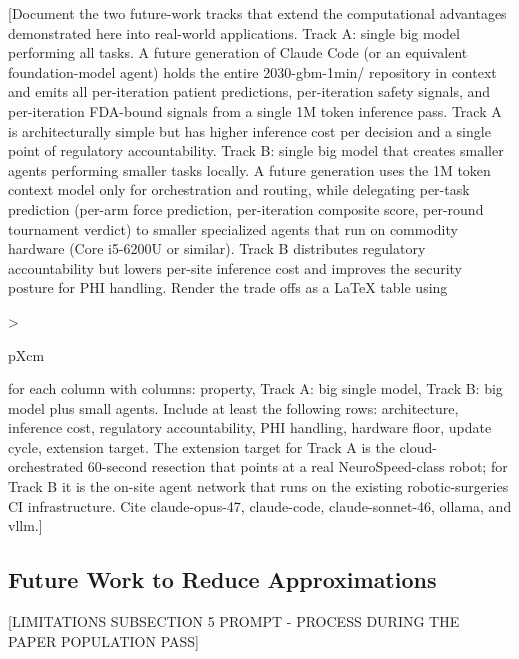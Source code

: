 [Document the two future-work tracks that extend the computational
advantages demonstrated here into real-world applications. Track A:
single big model performing all tasks. A future generation of Claude
Code (or an equivalent foundation-model agent) holds the entire
2030-gbm-1min/ repository in context and emits all per-iteration
patient predictions, per-iteration safety signals, and per-iteration
FDA-bound signals from a single 1M token inference pass. Track A is
architecturally simple but has higher inference cost per decision
and a single point of regulatory accountability. Track B: single big
model that creates smaller agents performing smaller tasks locally.
A future generation uses the 1M token context model only for
orchestration and routing, while delegating per-task prediction
(per-arm force prediction, per-iteration composite score, per-round
tournament verdict) to smaller specialized agents that run on
commodity hardware (Core i5-6200U or similar). Track B distributes
regulatory accountability but lowers per-site inference cost and
improves the security posture for PHI handling. Render the trade
offs as a LaTeX table using {>{\raggedright\arraybackslash}p{Xcm}}
for each column with columns: property, Track A: big single model,
Track B: big model plus small agents. Include at least the following
rows: architecture, inference cost, regulatory accountability, PHI
handling, hardware floor, update cycle, extension target. The
extension target for Track A is the cloud-orchestrated 60-second
resection that points at a real NeuroSpeed-class robot; for Track B
it is the on-site agent network that runs on the existing
robotic-surgeries CI infrastructure. Cite claude-opus-47, claude-code,
claude-sonnet-46, ollama, and vllm.]

\subsection{Future Work to Reduce Approximations}
\label{sec:limits-future}

[LIMITATIONS SUBSECTION 5 PROMPT - PROCESS DURING THE PAPER POPULATION PASS]

